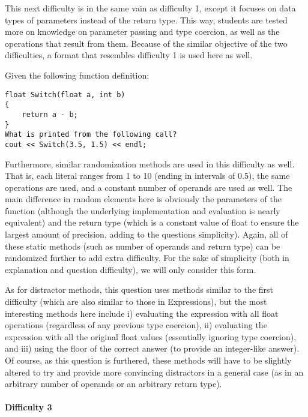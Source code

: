 \documentclass{article}
\begin{document}
This next difficulty is in the same vain as difficulty 1, except it focuses on data types of parameters instead of the return type. This way, students are tested more on knowledge on parameter passing and type coercion, as well as the operations that result from them.
Because of the similar objective of the two difficulties, a format that resembles difficulty 1 is used here as well. 

\begin{VerbCM}
Given the following function definition:
\end{VerbCM}
\begin{lstlisting}
float Switch(float a, int b)
{
    return a - b;
}
What is printed from the following call?
cout << Switch(3.5, 1.5) << endl;
\end{lstlisting}

Furthermore, similar randomization methods are used in this difficulty as well. That is, each literal ranges from 1 to 10 (ending in intervals of 0.5), the same operations are used, and a constant number of operands are used as well. The main difference in random elements here 
is obviously the parameters of the function (although the underlying implementation and evaluation is nearly equivalent) and the return type (which is a constant value of float to ensure the largest amount of precision, adding to the questions simplicity). Again, all of these static methods (such as number of operands and return type) can be randomized further to add extra difficulty. For the sake of simplicity (both in explanation and question difficulty), we will only consider this form.

As for distractor methods, this question uses methods similar to the first difficulty (which are also similar to those in Expressions), but the most interesting methods here include i) evaluating the expression with all float operations (regardless of any previous type coercion), ii) evaluating the expression with all the original float values (essentially ignoring type coercion), and iii) using the floor of the correct answer (to provide an integer-like answer). Of course, as this question is furthered, these methods will have to be slightly altered to try and provide more convincing distractors in a general case (as in an arbitrary number of operands or an arbitrary return type).

\paragraph{Difficulty 3} \hfill \par
\end{document}

